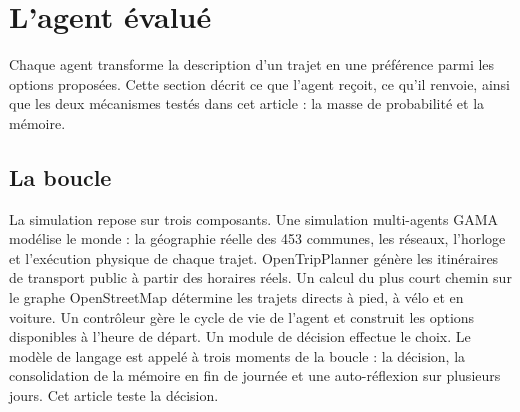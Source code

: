 
\section{L'agent évalué}
\label{sec:agent}

Chaque agent transforme la description d'un trajet en une préférence parmi les options proposées. Cette section décrit ce que l'agent reçoit, ce qu'il renvoie, ainsi que les deux mécanismes testés dans cet article : la masse de probabilité et la mémoire.

\subsection{La boucle}
\label{sec:loop}

La simulation repose sur trois composants. Une simulation multi-agents GAMA modélise le monde : la géographie réelle des 453 communes, les réseaux, l'horloge et l'exécution physique de chaque trajet. OpenTripPlanner génère les itinéraires de transport public à partir des horaires réels. Un calcul du plus court chemin sur le graphe OpenStreetMap détermine les trajets directs à pied, à vélo et en voiture. Un contrôleur gère le cycle de vie de l'agent et construit les options disponibles à l'heure de départ. Un module de décision effectue le choix. Le modèle de langage est appelé à trois moments de la boucle : la décision, la consolidation de la mémoire en fin de journée et une auto-réflexion sur plusieurs jours. Cet article teste la décision.

